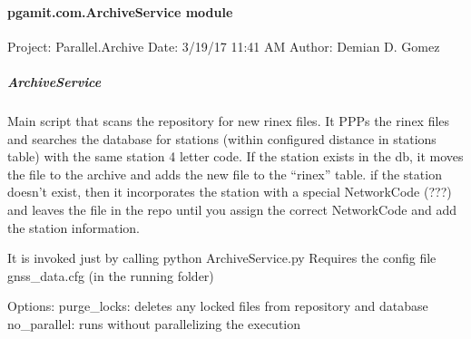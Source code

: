 \documentclass[letterpaper,10pt,english]{sphinxmanual}
\begin{document}
\paragraph{pgamit.com.ArchiveService module}
\label{\detokenize{pgamit.com:module-pgamit.com.ArchiveService}}\label{\detokenize{pgamit.com:pgamit-com-archiveservice-module}}
\sphinxAtStartPar
Project: Parallel.Archive
Date: 3/19/17 11:41 AM
Author: Demian D. Gomez


\subparagraph{ArchiveService}
\label{\detokenize{pgamit.com:archiveservice}}
\sphinxAtStartPar
Main script that scans the repository for new rinex files.
It PPPs the rinex files and searches the database for stations (within configured distance in stations table)
with the same station 4 letter code.
If the station exists in the db, it moves the file to the archive and adds the new file to the “rinex” table.
if the station doesn’t exist, then it incorporates the station with a special NetworkCode (???) and leaves the
file in the repo until you assign the correct NetworkCode and add the station information.

\sphinxAtStartPar
It is invoked just by calling python ArchiveService.py
Requires the config file gnss\_data.cfg (in the running folder)

\sphinxAtStartPar
Options:
\textendash{}purge\_locks: deletes any locked files from repository and database
\textendash{}no\_parallel: runs without parallelizing the execution

\begin{fulllineitems}
\label{\detokenize{pgamit.com:pgamit.com.ArchiveService.callback_handle}}
\pysigstartsignatures
\pysiglinewithargsret
{}
{}
{}
\pysigstopsignatures
\end{fulllineitems}


\begin{fulllineitems}
\label{\detokenize{pgamit.com:pgamit.com.ArchiveService.check_rinex_timespan_int}}
\pysigstartsignatures
\pysiglinewithargsret
{}
{\sphinxparamcomma {}}
{}
\pysigstopsignatures
\end{fulllineitems}
\end{document}

